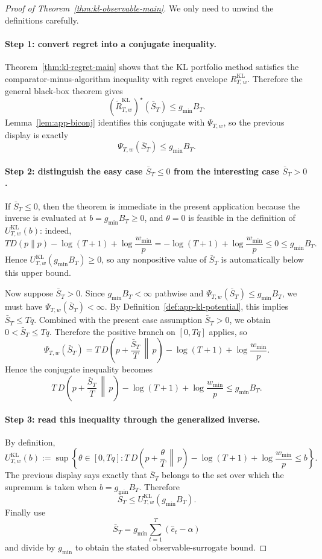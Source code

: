 \documentclass[11pt]{article}
\newcommand{\1}{\mathbf{1}}
\begin{document}
\begin{proof}[Proof of Theorem~\ref{thm:kl-observable-main}]
We only need to unwind the definitions carefully.

\paragraph{Step 1: convert regret into a conjugate inequality.}
Theorem~\ref{thm:kl-regret-main} shows that the KL portfolio method satisfies the comparator-minus-algorithm inequality with regret envelope $R_{T,w}^{\mathrm{KL}}$. Therefore the general black-box theorem gives
\[
(\widetilde R_{T,w}^{\mathrm{KL}})^\star(\bar S_T)\le g_{\min}B_T.
\]
Lemma~\ref{lem:app-biconj} identifies this conjugate with $\Psi_{T,w}$, so the previous display is exactly
\[
\Psi_{T,w}(\bar S_T)\le g_{\min}B_T.
\]

\paragraph{Step 2: distinguish the easy case $\bar S_T\le 0$ from the interesting case $\bar S_T>0$.}
If $\bar S_T\le 0$, then the theorem is immediate in the present application because the inverse is evaluated at $b=g_{\min}B_T\ge 0$, and $\theta=0$ is feasible in the definition of $U_{T,w}^{\mathrm{KL}}(b)$: indeed,
\[
T D(p\|p)-\log(T+1)+\log\frac{w_{\min}}{p}
= -\log(T+1)+\log\frac{w_{\min}}{p}\le 0\le g_{\min}B_T.
\]
Hence $U_{T,w}^{\mathrm{KL}}(g_{\min}B_T)\ge 0$, so any nonpositive value of $\bar S_T$ is automatically below this upper bound.

Now suppose $\bar S_T>0$. Since $g_{\min}B_T<\infty$ pathwise and $\Psi_{T,w}(\bar S_T)\le g_{\min}B_T$, we must have $\Psi_{T,w}(\bar S_T)<\infty$. By Definition~\ref{def:app-kl-potential}, this implies $\bar S_T\le Tq$. Combined with the present case assumption $\bar S_T>0$, we obtain $0<\bar S_T\le Tq$. Therefore the positive branch on $[0,Tq]$ applies, so
\[
\Psi_{T,w}(\bar S_T)
=
T\,D\!\left(p+\frac{\bar S_T}{T}\,\middle\|\,p\right)-\log(T+1)+\log\frac{w_{\min}}{p}.
\]
Hence the conjugate inequality becomes
\[
T\,D\!\left(p+\frac{\bar S_T}{T}\,\middle\|\,p\right)-\log(T+1)+\log\frac{w_{\min}}{p}\le g_{\min}B_T.
\]

\paragraph{Step 3: read this inequality through the generalized inverse.}
By definition,
\[
U_{T,w}^{\mathrm{KL}}(b)
:=
\sup\left\{\theta\in[0,Tq]:
T\,D\!\left(p+\frac{\theta}{T}\,\middle\|\,p\right)-\log(T+1)+\log\frac{w_{\min}}{p}\le b
\right\}.
\]
The previous display says exactly that $\bar S_T$ belongs to the set over which the supremum is taken when $b=g_{\min}B_T$. Therefore
\[
\bar S_T\le U_{T,w}^{\mathrm{KL}}(g_{\min}B_T).
\]
Finally use
\[
\bar S_T=g_{\min}\sum_{t=1}^T(\hat e_t-\alpha)
\]
and divide by $g_{\min}$ to obtain the stated observable-surrogate bound.
\end{proof}
\end{document}
